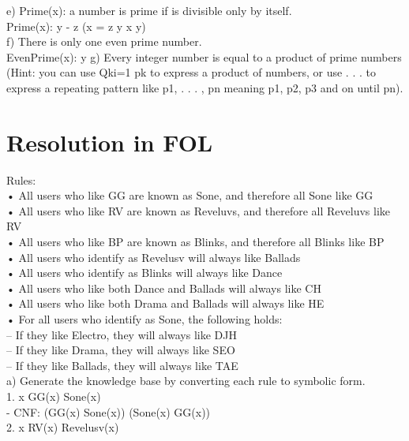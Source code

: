 \documentclass{article}
\begin{document}
e) Prime(x): a number is prime if is divisible only by itself.\\
Prime(x): \forall y - \exists z (x = z \times y \wedge x \neq y)\\

f) There is only one even prime number.\\
EvenPrime(x): \exists y 
g) Every integer number is equal to a product of prime numbers (Hint: you can use Qki=1 pk to express a product of numbers, or use . . . to express a repeating pattern like p1, . . . , pn meaning p1, p2, p3 and on until pn).\\

\section{Resolution in FOL}

Rules: \\
• All users who like GG are known as Sone, and therefore all Sone like GG\\
• All users who like RV are known as Reveluvs, and therefore all Reveluvs like RV\\
• All users who like BP are known as Blinks, and therefore all Blinks like BP\\
• All users who identify as Revelusv will always like Ballads\\
• All users who identify as Blinks will always like Dance\\
• All users who like both Dance and Ballads will always like CH\\
• All users who like both Drama and Ballads will always like HE\\
• For all users who identify as Sone, the following holds:\\
– If they like Electro, they will always like DJH\\
– If they like Drama, they will always like SEO\\
– If they like Ballads, they will always like TAE\\

a) Generate the knowledge base by converting each rule to symbolic form.\\

1. \forall x \: GG(x) \Leftrightarrow Sone(x)\\

\: \: \: \: - CNF: (\neg GG(x) \vee Sone(x)) \wedge (\neg Sone(x) \vee GG(x))\\

2. \forall x \: RV(x) \Leftrightarrow Revelusv(x)\\
\end{document}
